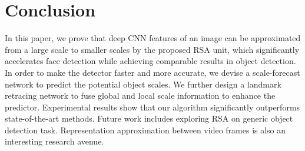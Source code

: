 \documentclass[10pt,twocolumn,letterpaper]{article}
\begin{document}
\section{Conclusion}
In this paper, we prove that deep CNN features of an image can be approximated from a large scale to smaller scales by the proposed RSA unit, which significantly accelerates face detection while achieving comparable results in object detection.
In order to make the detector faster and more accurate, we devise a scale-forecast network to predict the potential object scales.
%
We further design a landmark retracing network to fuse global and local scale information to enhance the predictor. Experimental results show that our algorithm significantly outperforms state-of-the-art methods. Future work includes exploring RSA on generic object detection task. Representation approximation between video frames is also an interesting research avenue.


{\small


}
\end{document}
